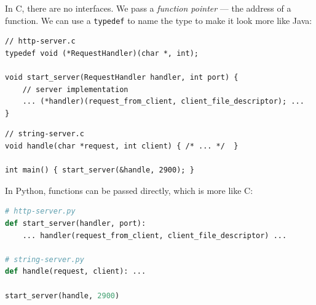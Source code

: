 \documentclass[oneside, landscape]{article}
\begin{document}
\begin{minipage}[t]{0.50\textwidth}

\vspace{2em}

In C, there are no interfaces. We pass a \textit{function pointer} — the
address of a function. We can use a \lstinline{typedef} to name the type to
make it look more like Java:

\begin{lstlisting}[frame=single, basicstyle=\ttfamily\footnotesize, numbers=none]
// http-server.c
typedef void (*RequestHandler)(char *, int);

void start_server(RequestHandler handler, int port) {
    // server implementation
    ... (*handler)(request_from_client, client_file_descriptor); ...
}
\end{lstlisting}

\begin{lstlisting}[frame=single, basicstyle=\ttfamily\footnotesize, numbers=none]
// string-server.c
void handle(char *request, int client) { /* ... */  }

int main() { start_server(&handle, 2900); }
\end{lstlisting}

\vspace{0.5em}

In Python, functions can be passed directly, which is more like C:

\begin{lstlisting}[frame=single, language=Python, basicstyle=\ttfamily\footnotesize, numbers=none]
# http-server.py
def start_server(handler, port):
    ... handler(request_from_client, client_file_descriptor) ...

# string-server.py
def handle(request, client): ...

start_server(handle, 2900)
\end{lstlisting}

\end{minipage}
\end{document}
